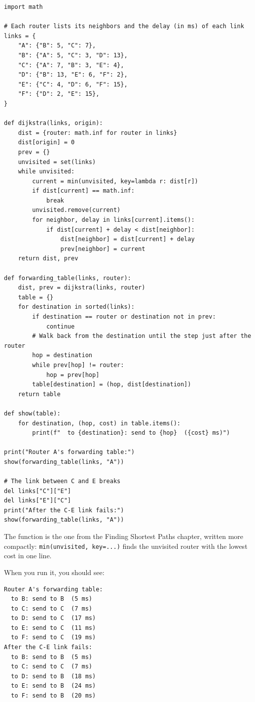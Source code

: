 \begin{verbatim}
import math

# Each router lists its neighbors and the delay (in ms) of each link
links = {
    "A": {"B": 5, "C": 7},
    "B": {"A": 5, "C": 3, "D": 13},
    "C": {"A": 7, "B": 3, "E": 4},
    "D": {"B": 13, "E": 6, "F": 2},
    "E": {"C": 4, "D": 6, "F": 15},
    "F": {"D": 2, "E": 15},
}

def dijkstra(links, origin):
    dist = {router: math.inf for router in links}
    dist[origin] = 0
    prev = {}
    unvisited = set(links)
    while unvisited:
        current = min(unvisited, key=lambda r: dist[r])
        if dist[current] == math.inf:
            break
        unvisited.remove(current)
        for neighbor, delay in links[current].items():
            if dist[current] + delay < dist[neighbor]:
                dist[neighbor] = dist[current] + delay
                prev[neighbor] = current
    return dist, prev

def forwarding_table(links, router):
    dist, prev = dijkstra(links, router)
    table = {}
    for destination in sorted(links):
        if destination == router or destination not in prev:
            continue
        # Walk back from the destination until the step just after the router
        hop = destination
        while prev[hop] != router:
            hop = prev[hop]
        table[destination] = (hop, dist[destination])
    return table

def show(table):
    for destination, (hop, cost) in table.items():
        print(f"  to {destination}: send to {hop}  ({cost} ms)")

print("Router A's forwarding table:")
show(forwarding_table(links, "A"))

# The link between C and E breaks
del links["C"]["E"]
del links["E"]["C"]
print("After the C-E link fails:")
show(forwarding_table(links, "A"))
\end{verbatim}

The  function is the one from the Finding Shortest Paths chapter, written more
compactly: \verb|min(unvisited, key=...)| finds the unvisited router with the lowest cost in one line.

When you run it, you should see:
\begin{verbatim}
Router A's forwarding table:
  to B: send to B  (5 ms)
  to C: send to C  (7 ms)
  to D: send to C  (17 ms)
  to E: send to C  (11 ms)
  to F: send to C  (19 ms)
After the C-E link fails:
  to B: send to B  (5 ms)
  to C: send to C  (7 ms)
  to D: send to B  (18 ms)
  to E: send to B  (24 ms)
  to F: send to B  (20 ms)
\end{verbatim}

